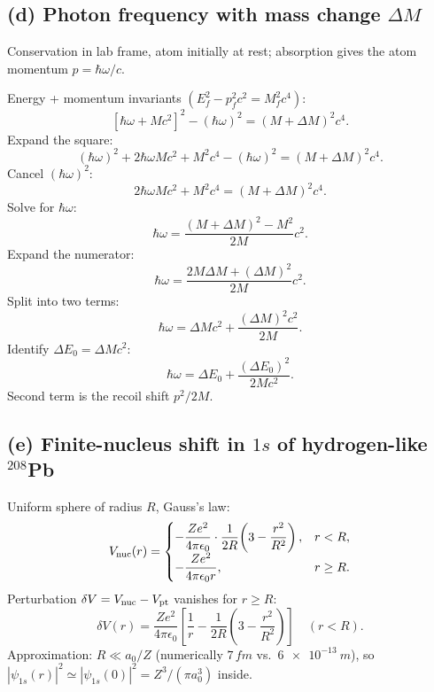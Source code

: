 \documentclass[11pt]{article}
\begin{document}
\subsection*{(d) Photon frequency with mass change $\Delta M$}

Conservation in lab frame, atom initially at rest; absorption gives the atom momentum $p=\hbar\omega/c$.

Energy + momentum invariants $(E_f^2-p_f^2 c^2=M_f^2 c^4)$:
\[
[\hbar\omega+Mc^2]^2-(\hbar\omega)^2=(M+\Delta M)^2 c^4.
\]
Expand the square:
\[
(\hbar\omega)^2+2\hbar\omega Mc^2+M^2 c^4-(\hbar\omega)^2=(M+\Delta M)^2 c^4.
\]
Cancel $(\hbar\omega)^2$:
\[
2\hbar\omega Mc^2+M^2 c^4=(M+\Delta M)^2 c^4.
\]
Solve for $\hbar\omega$:
\[
\hbar\omega=\frac{(M+\Delta M)^2-M^2}{2M}c^2.
\]
Expand the numerator:
\[
\hbar\omega=\frac{2M\Delta M+(\Delta M)^2}{2M}c^2.
\]
Split into two terms:
\[
\hbar\omega=\Delta M c^2+\frac{(\Delta M)^2 c^2}{2M}.
\]
Identify $\Delta E_0=\Delta M c^2$:
\begin{equation}
\boxed{\;\hbar\omega=\Delta E_0+\frac{(\Delta E_0)^2}{2Mc^2}.\;}
\label{eq:recoil}
\end{equation}
Second term is the recoil shift $p^2/2M$.

\subsection*{(e) Finite-nucleus shift in $1s$ of hydrogen-like $^{208}$Pb}

Uniform sphere of radius $R$, Gauss's law:
\[
V_{\rm nuc}(r)=\begin{cases}-\dfrac{Ze^2}{4\pi\epsilon_0}\cdot\dfrac{1}{2R}\!\left(3-\dfrac{r^2}{R^2}\right),&r<R,\\[4pt]-\dfrac{Ze^2}{4\pi\epsilon_0 r},&r\ge R.\end{cases}
\]
Perturbation $\delta V=V_{\rm nuc}-V_{\rm pt}$ vanishes for $r\ge R$:
\[
\delta V(r)=\frac{Ze^2}{4\pi\epsilon_0}\!\left[\frac{1}{r}-\frac{1}{2R}\!\left(3-\frac{r^2}{R^2}\right)\right]\quad(r<R).
\]
Approximation: $R\ll a_0/Z$ (numerically $7\,\si{fm}$ vs.\ $\SI{6e-13}{m}$), so $|\psi_{1s}(r)|^2\simeq|\psi_{1s}(0)|^2=Z^3/(\pi a_0^3)$ inside.
\end{document}
